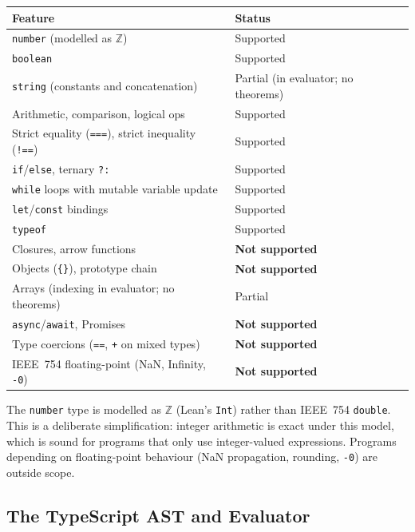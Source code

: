 \begin{center}
\small
\begin{tabular}{@{}ll@{}}
\toprule
\textbf{Feature}                  & \textbf{Status} \\
\midrule
\texttt{number} (modelled as $\mathbb{Z}$) & Supported \\
\texttt{boolean}                   & Supported \\
\texttt{string} (constants and concatenation) & Partial (in evaluator; no theorems) \\
Arithmetic, comparison, logical ops & Supported \\
Strict equality (\texttt{===}), strict inequality (\texttt{!==}) & Supported \\
\texttt{if}/\texttt{else}, ternary \texttt{?:} & Supported \\
\texttt{while} loops with mutable variable update & Supported \\
\texttt{let}/\texttt{const} bindings & Supported \\
\texttt{typeof}                    & Supported \\
\midrule
Closures, arrow functions          & \textbf{Not supported} \\
Objects (\texttt{\{\}}), prototype chain & \textbf{Not supported} \\
Arrays (indexing in evaluator; no theorems) & Partial \\
\texttt{async}/\texttt{await}, Promises & \textbf{Not supported} \\
Type coercions (\texttt{==}, \texttt{+} on mixed types) & \textbf{Not supported} \\
IEEE~754 floating-point (NaN, Infinity, \texttt{-0}) & \textbf{Not supported} \\
\bottomrule
\end{tabular}
\end{center}

\noindent
The \texttt{number} type is modelled as $\mathbb{Z}$ (Lean's \texttt{Int})
rather than IEEE~754 \texttt{double}. This is a deliberate simplification:
integer arithmetic is exact under this model, which is sound for programs
that only use integer-valued expressions. Programs depending on floating-point
behaviour (NaN propagation, rounding, \texttt{-0}) are outside scope.

\subsection{The TypeScript AST and Evaluator}

